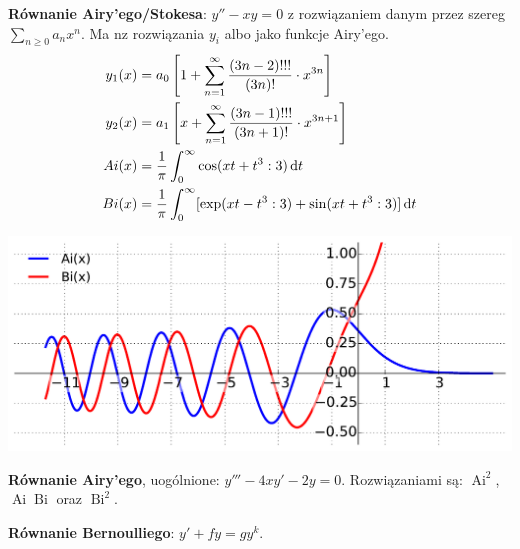 

\renewcommand{\footrulewidth}{0.4pt}


\begin{multicols*}{2}
\begin{enumx}
\item \textbf{Równanie Airy'ego/Stokesa}: $y'' - xy = 0$ z rozwiązaniem danym przez szereg $\sum_{n \ge 0} a_n x^n$.
Ma nz rozwiązania $y_i$ albo jako funkcje Airy'ego.
\begin{align*}
 y_1(x) & = a_0 \left[1 + \sum_{n=1}^\infty \frac{(3n-2)!!!}{(3n)!} \cdot x^{3n} \right] \\
 y_2(x) & = a_1 \left[x + \sum_{n=1}^\infty \frac{(3n-1)!!!}{(3n+1)!} \cdot x^{3n+1}\right] \\
 Ai(x) & = \frac 1 \pi \int_0^\infty \cos (xt + t^3:3) \, \textrm{d} t \\
 Bi(x) & = \frac 1 \pi \int_0^\infty [\exp (x t - t^3:3) + \sin (xt + t^3:3)] \,\textrm{d} t
\end{align*}
\end{enumx}
\begin{center}
	\includegraphics[width=0.9\columnwidth]{airy.pdf}
\end{center}
\begin{enumx}
\item \textbf{Równanie Airy'ego}, uogólnione: $y''' - 4xy'- 2y = 0$.
Rozwiązaniami są: $\operatorname{Ai}^2$,  $\operatorname{Ai} \operatorname{Bi}$ oraz $\operatorname{Bi}^2$.
\item \textbf{Równanie Bernoulliego}: $y' + f y = g y^k$.

\end{enumx}
\end{multicols*}
